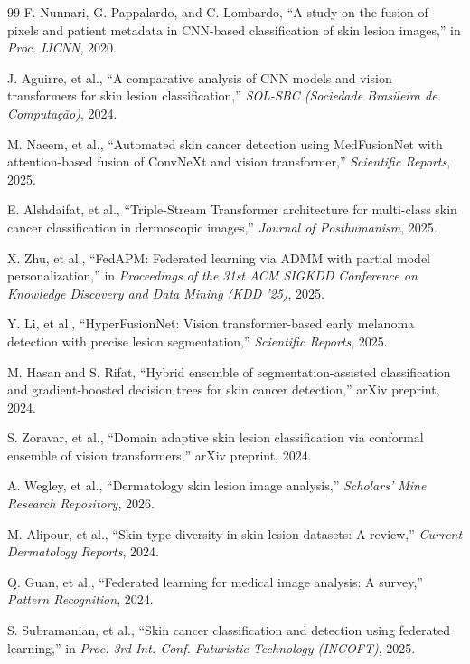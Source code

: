 \documentclass{ieeeaccess}
\begin{document}
\begin{thebibliography}{99}
F. Nunnari, G. Pappalardo, and C. Lombardo,
“A study on the fusion of pixels and patient metadata in CNN-based classification of skin lesion images,”
in \emph{Proc. IJCNN}, 2020.

J. Aguirre, et al.,
“A comparative analysis of CNN models and vision transformers for skin lesion classification,”
\emph{SOL-SBC (Sociedade Brasileira de Computação)}, 2024.

M. Naeem, et al.,
“Automated skin cancer detection using MedFusionNet with attention-based fusion of ConvNeXt and vision transformer,”
\emph{Scientific Reports}, 2025.

E. Alshdaifat, et al.,
“Triple-Stream Transformer architecture for multi-class skin cancer classification in dermoscopic images,”
\emph{Journal of Posthumanism}, 2025.

X. Zhu, et al.,
“FedAPM: Federated learning via ADMM with partial model personalization,”
in \emph{Proceedings of the 31st ACM SIGKDD Conference on Knowledge Discovery and Data Mining (KDD ’25)}, 2025.

Y. Li, et al.,
“HyperFusionNet: Vision transformer-based early melanoma detection with precise lesion segmentation,”
\emph{Scientific Reports}, 2025.

M. Hasan and S. Rifat,
“Hybrid ensemble of segmentation-assisted classification and gradient-boosted decision trees for skin cancer detection,”
arXiv preprint, 2024.

S. Zoravar, et al.,
“Domain adaptive skin lesion classification via conformal ensemble of vision transformers,”
arXiv preprint, 2024.

A. Wegley, et al.,
“Dermatology skin lesion image analysis,”
\emph{Scholars' Mine Research Repository}, 2026.

M. Alipour, et al.,
“Skin type diversity in skin lesion datasets: A review,”
\emph{Current Dermatology Reports}, 2024.

Q. Guan, et al.,
“Federated learning for medical image analysis: A survey,”
\emph{Pattern Recognition}, 2024.

S. Subramanian, et al.,
“Skin cancer classification and detection using federated learning,”
in \emph{Proc. 3rd Int. Conf. Futuristic Technology (INCOFT)}, 2025.


\end{thebibliography}
\end{document}
